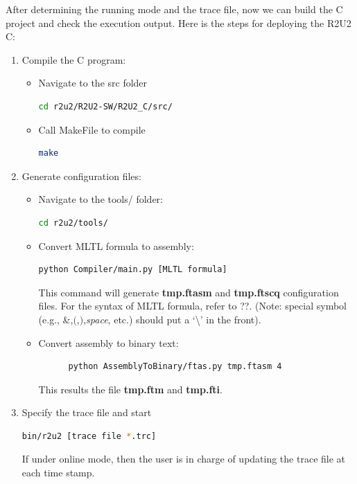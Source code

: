After determining the running mode and the trace file, now we can build the C project and check the execution output. Here is the steps for deploying the R2U2 C:
\begin{enumerate}
  \item Compile the C program:
    \begin{itemize}
      \item Navigate to the src folder
      \begin{lstlisting}[language=Bash]
      cd r2u2/R2U2-SW/R2U2_C/src/
      \end{lstlisting}
      \item Call MakeFile to compile
      \begin{lstlisting}[language=Bash]
      make
      \end{lstlisting}
    \end{itemize}

  \item Generate configuration files:
    \begin{itemize}
      \item Navigate to the tools/ folder:
      \begin{lstlisting}[language=Bash]
      cd r2u2/tools/
      \end{lstlisting}
      \item Convert MLTL formula to assembly:
      \begin{lstlisting}[language=Bash]
      python Compiler/main.py [MLTL formula]
      \end{lstlisting}
      This command will generate \textbf{tmp.ftasm} and \textbf{tmp.ftscq} configuration files.
      For the syntax of MLTL formula, refer to ??. (Note: special symbol (e.g., \&,$($,$)$,\textit{space}, etc.) should put a `\textbackslash' in the front).
      \item Convert assembly to binary text:
      \begin{lstlisting}[language=Bash]
      %#cat tmp.ftasm | python AssemblyToBinary/ftas.py tmp
      python AssemblyToBinary/ftas.py tmp.ftasm 4
      \end{lstlisting}
      This results the file \textbf{tmp.ftm} and \textbf{tmp.fti}.
    \end{itemize}

  \item Specify the trace file and start
  \begin{lstlisting}[language=Bash]
    bin/r2u2 [trace file *.trc]
  \end{lstlisting}
  If under online mode, then the user is in charge of updating the trace file at each time stamp.
\end{enumerate}

\clearpage

